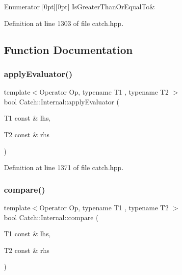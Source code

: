 \begin{DoxyEnumFields}{Enumerator}
[0pt][0pt]{}\hypertarget{namespace_catch_1_1_internal_ae3f96598a7858155750bf38e7295d83ead2de7e9565e59e36c0987e402203ce1c}{}\label{namespace_catch_1_1_internal_ae3f96598a7858155750bf38e7295d83ead2de7e9565e59e36c0987e402203ce1c} 
Is\+Greater\+Than\+Or\+Equal\+To&\\
\hline

\end{DoxyEnumFields}


Definition at line 1303 of file catch.\+hpp.



\subsection{Function Documentation}
\hypertarget{namespace_catch_1_1_internal_a3849d993997f2b708281ff02e77dfecf}{}\label{namespace_catch_1_1_internal_a3849d993997f2b708281ff02e77dfecf} 
\subsubsection{\texorpdfstring{apply\+Evaluator()}{applyEvaluator()}}
{\footnotesize\ttfamily template$<$Operator Op, typename T1 , typename T2 $>$ \\
bool Catch\+::\+Internal\+::apply\+Evaluator (\begin{DoxyParamCaption}\item[{T1 const \&}]{lhs,  }\item[{T2 const \&}]{rhs }\end{DoxyParamCaption})}



Definition at line 1371 of file catch.\+hpp.

\hypertarget{namespace_catch_1_1_internal_a64ae04769c4583b9d4027c792b496c7d}{}\label{namespace_catch_1_1_internal_a64ae04769c4583b9d4027c792b496c7d} 
\subsubsection{\texorpdfstring{compare()}{compare()}\hspace{0.1cm}{\footnotesize\ttfamily [1/17]}}
{\footnotesize\ttfamily template$<$Operator Op, typename T1 , typename T2 $>$ \\
bool Catch\+::\+Internal\+::compare (\begin{DoxyParamCaption}\item[{T1 const \&}]{lhs,  }\item[{T2 const \&}]{rhs }\end{DoxyParamCaption})}



